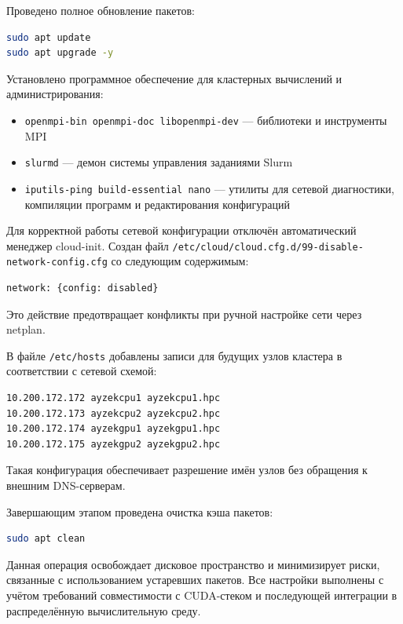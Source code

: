 \documentclass[areaset=advanced]{scrartcl}
\begin{document}
Проведено полное обновление пакетов:

\begin{lstlisting}[language=bash]
sudo apt update
sudo apt upgrade -y
\end{lstlisting}

Установлено программное обеспечение для кластерных вычислений и администрирования:
\begin{itemize}
    \item \texttt{openmpi-bin openmpi-doc libopenmpi-dev} — библиотеки и инструменты MPI
    \item \texttt{slurmd} — демон системы управления заданиями Slurm
    \item \texttt{iputils-ping build-essential nano} — утилиты для сетевой диагностики, компиляции программ и редактирования конфигураций
\end{itemize}

Для корректной работы сетевой конфигурации отключён автоматический менеджер cloud-init. Создан файл \texttt{/etc/cloud/cloud.cfg.d/99-disable-network-config.cfg} со следующим содержимым:

\begin{lstlisting}[language=bash]
network: {config: disabled}
\end{lstlisting}

Это действие предотвращает конфликты при ручной настройке сети через netplan.

В файле \texttt{/etc/hosts} добавлены записи для будущих узлов кластера в соответствии с сетевой схемой:

\begin{lstlisting}[language=bash]
10.200.172.172 ayzekcpu1 ayzekcpu1.hpc
10.200.172.173 ayzekcpu2 ayzekcpu2.hpc
10.200.172.174 ayzekgpu1 ayzekgpu1.hpc
10.200.172.175 ayzekgpu2 ayzekgpu2.hpc
\end{lstlisting}

Такая конфигурация обеспечивает разрешение имён узлов без обращения к внешним DNS-серверам.

Завершающим этапом проведена очистка кэша пакетов:

\begin{lstlisting}[language=bash]
sudo apt clean
\end{lstlisting}

Данная операция освобождает дисковое пространство и минимизирует риски, связанные с использованием устаревших пакетов. Все настройки выполнены с учётом требований совместимости с CUDA-стеком и последующей интеграции в распределённую вычислительную среду.
\end{document}
